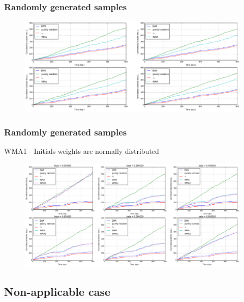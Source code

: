 \documentclass{beamer}
\begin{document}
\begin{frame}
	\frametitle{Randomly generated samples }
	\begin{figure}
		\includegraphics[scale=0.25]{download.png}
	\end{figure}
\end{frame}
\begin{frame}
	\frametitle{Randomly generated samples }
	\textsc{WMA1} - Initials weights are normally distributed
	\begin{figure}
		\includegraphics[scale=0.25]{download2.png}
	\end{figure}
\end{frame}

		\subsection{Non-applicable case}
\end{document}
